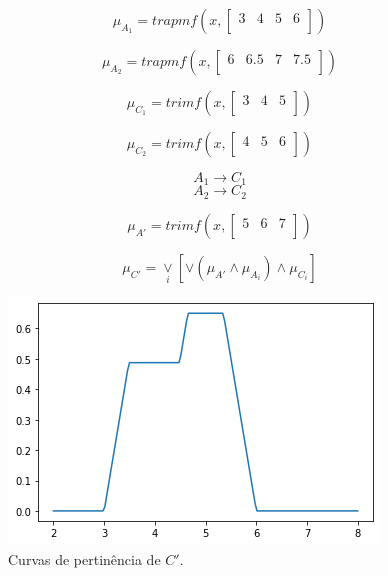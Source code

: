 \documentclass[conference]{IEEEtran}
\newcommand\w{1.0}
\begin{document}
\[
\mu_{A_1} = trapmf(x, 
\begin{bmatrix}
3 & 4 & 5 & 6 \\
\end{bmatrix})
\]

\[
\mu_{A_2} = trapmf(x, 
\begin{bmatrix}
6 & 6.5 & 7 & 7.5 \\
\end{bmatrix})
\]

\[
\mu_{C_1} = trimf(x, 
\begin{bmatrix}
3 & 4 & 5 \\
\end{bmatrix})
\]

\[
\mu_{C_2} = trimf(x, 
\begin{bmatrix}
4 & 5 & 6 \\
\end{bmatrix})
\]

\[A_1 \rightarrow C_1\]
\[A_2 \rightarrow C_2\]

\[
\mu_{A'} = trimf(x, 
\begin{bmatrix}
5 & 6 & 7 \\
\end{bmatrix})
\]

\hfill

\[
\mu_{C'} = \underset{i}{\vee} [\vee (\mu_{A'} \wedge \mu_{A_i}) \wedge \mu_{C_i}]
\]

\begin{figure}[htbp]
\centering
\includegraphics[width=\w\linewidth]{fig/plot06.png}
\caption{Curvas de pertinência de $C'$.}
\label{fig:plot06}
\end{figure}
\end{document}
